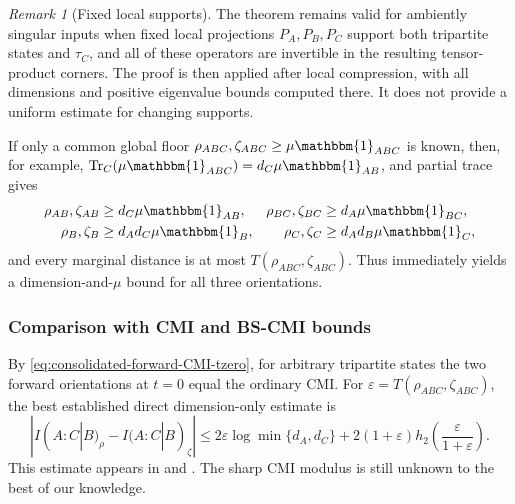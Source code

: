 \documentclass[11pt]{article}
\theoremstyle{remark}
\newtheorem{remark}[remark]{Remark}
\newcommand{\1}{\mathbbm{1}}
\begin{document}
\begin{remark}[Fixed local supports]
The theorem remains valid for ambiently singular inputs when fixed
local projections $P_A,P_B,P_C$ support both tripartite states and
$\tau_C$, and all of these operators are invertible in the resulting
tensor-product corners.  The proof is then applied after local
compression, with all dimensions and positive eigenvalue bounds
computed there.  It does not provide a uniform estimate for changing
supports.
\end{remark}

If only a common global floor
$\rho_{ABC},\zeta_{ABC}\geq\mu\1_{ABC}$ is known, then, for example,
$\operatorname{Tr}_C(\mu\1_{ABC})=d_C\mu\1_{AB}$, and partial trace
gives
\begin{equation}
 \begin{aligned}
 \rho_{AB},\zeta_{AB}&\geq d_C\mu\1_{AB},&
 \rho_{BC},\zeta_{BC}&\geq d_A\mu\1_{BC},\\
 \rho_B,\zeta_B&\geq d_Ad_C\mu\1_B,&
 \rho_C,\zeta_C&\geq d_Ad_B\mu\1_C,
 \end{aligned}
 \label{eq:three-orientation-marginal-floors}
\end{equation}
and every marginal distance is at most
$T(\rho_{ABC},\zeta_{ABC})$.  Thus
 immediately yields a
dimension-and-$\mu$ bound for all three orientations.

\subsubsection{Comparison with CMI and BS-CMI bounds}
\label{subsec:tCMI-endpoint-comparison}

By \eqref{eq:consolidated-forward-CMI-tzero}, for arbitrary
tripartite states the two forward orientations at $t=0$ equal the
ordinary CMI.  For
$\varepsilon=T(\rho_{ABC},\zeta_{ABC})$, the best established direct
dimension-only estimate is
\begin{equation}
 |I(A:C|B)_\rho-I(A:C|B)_\zeta|
 \leq2\varepsilon\log\min\{d_A,d_C\}
 +2(1+\varepsilon)h_2\!\left(
        \frac{\varepsilon}{1+\varepsilon}\right).
 \label{eq:ordinary-CMI-literature-bound}
\end{equation}
This estimate appears in \cite[Corollary~1]{shirokov2017tight} and
\cite[Corollary~5.7]{bluhm2023continuity}.  The sharp CMI modulus is
still unknown to the best of our knowledge.
\end{document}
